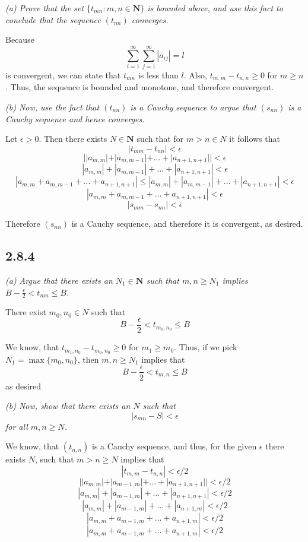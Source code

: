 \documentclass[11pt,oneside,titlepage]{book}
\begin{document}
\textit{(a) Prove that the set $\{t_{mn}: m, n \in \textbf{N}\}$ is bounded
  above, and use this fact to conclude that the sequence $(t_{nn})$ converges.}

Because
$$\sum_{i = 1}^{\infty}\sum_{j = 1}^{\infty}|a_{ij}| = l$$
is convergent, we can state that $t_{mn}$ is less than $l$. Also,
$t_{m, m} - t_{n,n} \geq 0$ for $m \geq n$. Thus, the sequence is bounded
and monotone, and therefore convergent.

\textit{(b) Now, use the fact that $(t_{nn})$ is a Cauchy sequence to argue
  that $(s_{nn})$ is a Cauchy sequence and hence converges.}

Let $\epsilon > 0$. Then there exists $N \in \textbf{N}$ such  that for
$m > n \in N$ it follows that
$$|t_{mm} - t_{nn}| < \epsilon$$
$$||a_{m,m}| + |a_{m, m - 1}| + ... + |a_{n + 1, n + 1}|| < \epsilon$$
$$|a_{m,m}| + |a_{m, m - 1}| + ... + |a_{n + 1, n + 1}| < \epsilon$$
$$|a_{m,m} + a_{m, m - 1} + ... + a_{n + 1, n + 1}| \leq |a_{m,m}| + |a_{m, m - 1}| + ... + |a_{n + 1, n + 1}| < \epsilon$$
$$|a_{m,m} + a_{m, m - 1} + ... + a_{n + 1, n + 1}|  < \epsilon$$
$$|s_{mm} - s_{nn}|  < \epsilon$$

Therefore $(s_{nn})$ is a Cauchy sequence, and therefore it is convergent, as
desired.

\subsection*{2.8.4}
\textit{(a) Argue that there exists an $N_1 \in \textbf{N}$ such that
  $m, n \geq N_1$ implies $B - \frac{\epsilon}{2} < t_{mn} \leq B$.}

There exist $m_0, n_0 \in N$ such that
$$B - \frac{\epsilon}{2} < t_{m_0, n_0} \leq B$$

We know, that $t_{m_1, n_0} - t_{m_0, n_0} \geq 0$ for $m_1 \geq m_0$. Thus,
if we pick $N_1 = \max\{m_0, n_0\}$, then $m, n \geq N_1$ implies that 
$$B - \frac{\epsilon}{2} < t_{m, n} \leq B$$
as desired

\textit{(b) Now, show that there exists an $N$ such that }
$$|s_{mn} - S| < \epsilon$$
\textit{for all $m, n \geq N$.}

We know, that $(t_{n,n})$ is a Cauchy sequence, and thus, for the given
$\epsilon$ there exists $N$, such that $m > n \geq N$ implies that 
$$|t_{m,m} - t_{n,n}| < \epsilon/2$$
$$||a_{m,m}| + |a_{m - 1, m}| + ... + |a_{n + 1,n + 1}|| < \epsilon/2$$
$$|a_{m,m}| + |a_{m - 1, m}| + ... + |a_{n + 1,n + 1}| < \epsilon/2$$
$$|a_{m,m}| + |a_{m - 1, m}| + ... + |a_{n + 1,m}| < \epsilon/2$$
$$|a_{m,m} + a_{m - 1, m} + ... + a_{n + 1,m}| < \epsilon/2$$
$$|a_{m,m} + a_{m - 1, m} + ... + a_{n + 1,m}| < \epsilon/2$$
\end{document}
